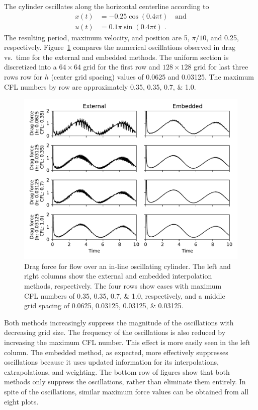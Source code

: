 \documentclass[preprint,12pt]{elsarticle}
\begin{document}
The cylinder oscillates along the horizontal centerline according to
\begin{align}
    x(t) &= -0.25 \cos(0.4\pi t) \quad \text{and} \label{eq:cylinder position}\\
    u(t) &= 0.1\pi \sin(0.4\pi t) \;. \label{eq:cylinder velocity}
\end{align}
The resulting period, maximum velocity, and position are 5, $\pi/10$, and 0.25, respectively.
Figure~\ref{fig:osccylinder} compares the numerical oscillations observed in drag vs.~time
for the external and embedded methods. The uniform section is discretized into a $64 \times 64$ grid
for the first row and $ 128 \times 128$ grid for last three rows row for $h$ (center
grid spacing) values of 0.0625 and 0.03125. The maximum CFL numbers by row are
approximately \numlist{0.35; 0.35; 0.7; 1.0}.
\begin{figure}[htbp]
    \centering
    \includegraphics[width=\textwidth]{osc_cylinder}
    \caption{Drag force for flow over an in-line oscillating cylinder. The left
    and right columns show the external and embedded interpolation methods, respectively.
    The four rows show cases with maximum CFL numbers of \numlist{0.35; 0.35; 0.7; 1.0},
    respectively, and a middle grid spacing of \numlist{0.0625; 0.03125; 0.03125; 0.03125}.}
    \label{fig:osccylinder}
\end{figure}

Both methods increasingly suppress the magnitude of the oscillations with decreasing grid size.
The frequency of the oscillations is also reduced by increasing the maximum CFL number.
This effect is more easily seen in the left column.
The embedded method, as expected, more effectively suppresses oscillations because
it uses updated information for its interpolations, extrapolations, and weighting.
The bottom row of figures show that both methods only suppress the oscillations,
rather than eliminate them entirely. In spite of the oscillations, similar maximum
force values can be obtained from all eight plots.
\end{document}
